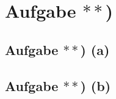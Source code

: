 \documentclass[12pt,a4paper]{article}
\begin{document}
\section*{Aufgabe $\ast\ast$)}
\subsection*{Aufgabe $\ast\ast$) (a)}


\subsection*{Aufgabe $\ast\ast$) (b)}

\end{document}
